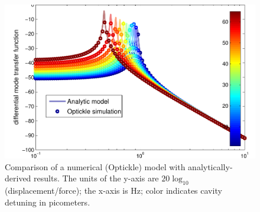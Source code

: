 \begin{figure}[H]
\includegraphics{figures/model-comparison}
\caption[Optical spring transfer function (numerical and analytic)]{\label{fig:model-comparison}Comparison of a numerical
  (Optickle) model with analytically-derived results. The units of the
  y-axis are $20\log_{10}$(displacement/force); the x-axis is Hz;
  color indicates cavity detuning in picometers.}
\end{figure}
